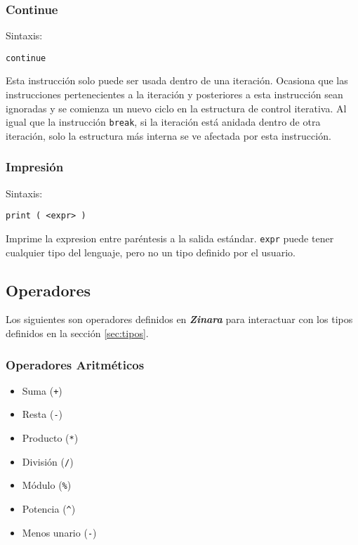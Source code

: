 \documentclass[12pt, spanish]{report}
\begin{document}
\subsubsection{Continue}
\label{sec:return}
Sintaxis:
\begin{verbatim}
continue
\end{verbatim}

Esta instrucci\'on solo puede ser usada dentro de una
iteraci\'on. Ocasiona que las instrucciones pertenecientes a la
iteraci\'on y posteriores a esta instrucci\'on sean ignoradas y se
comienza un nuevo ciclo en la estructura de control iterativa.
Al igual que la instrucci\'on \texttt{break}, si la iteraci\'on est\'a
anidada dentro de otra iteraci\'on, solo la estructura m\'as interna se
ve afectada por esta instrucci\'on.

\subsubsection{Impresi\'on}
Sintaxis:
\begin{verbatim}
print ( <expr> )
\end{verbatim}

Imprime la expresion entre par\'entesis a la salida est\'andar. \texttt{expr}
puede tener cualquier tipo del lenguaje, pero no un tipo definido por el usuario.


\subsection{Operadores}
\label{sec:ops}

Los siguientes son operadores definidos en \emph{\textbf{Zinara}} para
interactuar con los tipos definidos en la secci\'on \ref{sec:tipos}.

\subsubsection{Operadores Aritm\'eticos}
\begin{itemize}
\item Suma (\texttt{+})
\item Resta    (\texttt{-})
\item Producto (\texttt{*})
\item Divisi\'on  (\texttt{/})
\item M\'odulo (\texttt{\%})
\item Potencia (\texttt{\^})
\item Menos unario (\texttt{-})
\end{itemize}
\end{document}
